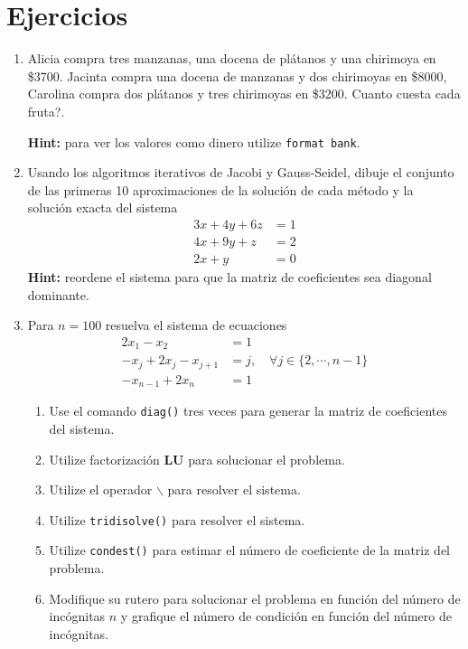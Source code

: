 \documentclass[12pt,letterpaper]{article}
\begin{document}
\section{Ejercicios}
\begin{enumerate}
\item Alicia compra tres manzanas, una docena de pl\'atanos y una chirimoya en \$3700. Jacinta compra una docena de manzanas y dos chirimoyas en \$8000, Carolina compra dos pl\'atanos y tres chirimoyas en \$3200. \textquestiondown Cuanto cuesta cada fruta?.

\textbf{Hint:} para ver los valores como dinero utilize \texttt{format bank}.

\item Usando los algoritmos iterativos de Jacobi y Gauss-Seidel, dibuje el conjunto de las primeras 10 aproximaciones de la soluci\'on de cada m\'etodo y la soluci\'on exacta del sistema
$$
\begin{array}{cl}
3x+4y+6z	& = 1\\
4x+9y+z	& = 2\\
2x+y		& = 0
\end{array}
$$
\textbf{Hint:} reordene el sistema para que la matriz de coeficientes sea diagonal dominante.

\item Para $n=100$ resuelva el sistema de ecuaciones
$$
\begin{array}{ll}
2x_1-x_2			&	=1\\
-x_j+2x_j-x_{j+1}	& 	=j , \quad \forall j\in\{2,\cdots,n-1\}\\
-x_{n-1}+2x_n		&	=1
\end{array}
$$
\begin{enumerate}
\item Use el comando \texttt{diag()} tres veces para generar la matriz de coeficientes del sistema.
\item Utilize factorizaci\'on \textbf{LU} para solucionar el problema.
\item Utilize el operador $\backslash$ para resolver el sistema.
\item Utilize \texttt{tridisolve()} para resolver el sistema.
\item Utilize \texttt{condest()} para estimar el n\'umero de coeficiente de la matriz del problema.
\item Modifique su rutero para solucionar el problema en funci\'on del n\'umero de inc\'ognitas $n$ y grafique el n\'umero de condici\'on en funci\'on del n\'umero de inc\'ognitas.
\end{enumerate}


\end{enumerate}
\end{document}
